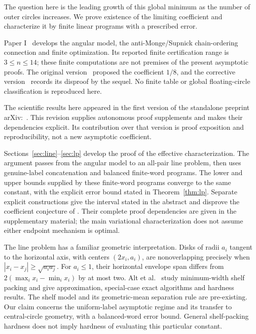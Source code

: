\documentclass[11pt,letterpaper]{article}
\theoremstyle{definition}\newtheorem{definition}[theorem]{Definition}
\theoremstyle{remark}\newtheorem{remark}[theorem]{Remark}
\begin{document}
The question here is the leading growth of this global minimum as the
number of outer circles increases. We prove existence of the limiting
coefficient and characterize it by finite linear programs with a prescribed
error.

Paper I~\cite{v3} develops the angular model, the anti-Monge/Supnick
chain-ordering connection and finite optimization. Its reported finite
certification range is $3\le n\le14$; these finite computations are not
premises of the present asymptotic proofs. The original version~\cite{v1}
proposed the coefficient $1/8$, and the corrective version~\cite{v2}
records its disproof by the sequel.
No finite table or global floating-circle classification is reproduced here.

The scientific results here appeared in the first version of the standalone
preprint arXiv:~\cite{preprint}. This revision supplies autonomous
proof supplements and makes their dependencies explicit. Its contribution
over that version is proof exposition and reproducibility, not a new
asymptotic coefficient.

Sections~\ref{sec:line}--\ref{sec:lp} develop the proof of the effective
characterization. The argument passes from the angular model to an all-pair
line problem, then uses genuine-label concatenation and balanced finite-word
programs. The lower and upper bounds supplied by these finite-word programs
converge to the same constant, with the explicit error bound stated in
Theorem~\ref{thm:lp}. Separate explicit
constructions give the interval stated in the abstract and disprove the
coefficient conjecture of \cite{v1}. Their complete proof dependencies are
given in the supplementary material; the main variational characterization does
not assume either endpoint mechanism is optimal.

The line problem has a familiar geometric interpretation. Disks of radii
$a_i$ tangent to the horizontal axis, with centers $(2x_i,a_i)$, are
nonoverlapping precisely when $|x_i-x_j|\ge\sqrt{a_i a_j}$.
For $a_i\le1$, their horizontal envelope span differs from
$2(\max_i x_i-\min_i x_i)$ by at most two. Alt et al.~\cite{shelf}
study minimum-width shelf packing and give approximation, special-case exact
algorithms and hardness results. The shelf model and its geometric-mean
separation rule are pre-existing. Our claim concerns the uniform-label
asymptotic regime and its transfer to central-circle geometry, with a
balanced-word error bound. General shelf-packing hardness does not imply
hardness of evaluating this particular constant.
\end{document}
